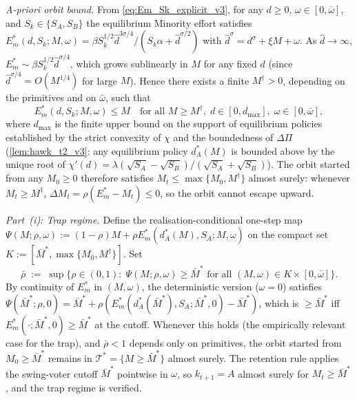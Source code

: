 \documentclass[11pt,twoside]{extarticle}
\begin{document}
\emph{A-priori orbit bound.} From \autoref{eq:Em_Sk_explicit_v3}, for any $d\ge 0$, $\omega\in[0,\bar\omega]$, and $S_k\in\{S_A,S_B\}$ the equilibrium Minority effort satisfies
$E_m^*(d,S_k;M,\omega)=\beta S_k^{1/2}\hat d^{3\sigma/4}/(S_k\alpha+\hat d^{\sigma/2})$
with $\hat d^\sigma=d^\sigma+\xi M+\omega$. As $\hat d\to\infty$, $E_m^*\sim\beta S_k^{1/2}\hat d^{\sigma/4}$, which grows sublinearly in $M$ for any fixed $d$ (since $\hat d^{\sigma/4}=O(M^{1/4})$ for large $M$). Hence there exists a finite $M^\dagger>0$, depending on the primitives and on $\bar\omega$, such that
\begin{equation}\label{eq:orbit_bound_v3}
E_m^*(d,S_k;M,\omega)\le M\quad\text{for all }M\ge M^\dagger,\;d\in[0,d_{\max}],\;\omega\in[0,\bar\omega],
\end{equation}
where $d_{\max}$ is the finite upper bound on the support of equilibrium policies established by the strict convexity of $\chi$ and the boundedness of $\Delta\Pi$ (\autoref{lem:hawk_t2_v3}: any equilibrium policy $d_A^*(M)$ is bounded above by the unique root of $\chi'(d)=\lambda(\sqrt{S_A}-\sqrt{S_B})/(\sqrt{S_A}+\sqrt{S_B})$). The orbit started from any $M_0\ge 0$ therefore satisfies $M_t\le\max\{M_0,M^\dagger\}$ almost surely: whenever $M_t\ge M^\dagger$, $\Delta M_t=\rho(E_m^*-M_t)\le 0$, so the orbit cannot escape upward.

\emph{Part~(i): Trap regime.} Define the realisation-conditional one-step map $\Psi(M;\rho,\omega):=(1-\rho)M+\rho E_m^*(d_A^*(M),S_A;M,\omega)$ on the compact set $K:=[\bar M^*,\max\{M_0,M^\dagger\}]$. Set
\[
\bar\rho\;:=\;\sup\{\rho\in(0,1):\;\Psi(M;\rho,\omega)\ge\bar M^*\text{ for all }(M,\omega)\in K\times[0,\bar\omega]\}.
\]
By continuity of $E_m^*$ in $(M,\omega)$, the deterministic version ($\omega=0$) satisfies $\Psi(\bar M^*;\rho,0)=\bar M^*+\rho(E_m^*(d_A^*(\bar M^*),S_A;\bar M^*,0)-\bar M^*)$, which is $\ge\bar M^*$ iff $E_m^*(\cdot;\bar M^*,0)\ge\bar M^*$ at the cutoff. Whenever this holds (the empirically relevant case for the trap), and $\bar\rho<1$ depends only on primitives, the orbit started from $M_0\ge\bar M^*$ remains in $\mathcal T^*=\{M\ge\bar M^*\}$ almost surely. The retention rule applies the swing-voter cutoff $\bar M^*$ pointwise in $\omega$, so $k_{t+1}=A$ almost surely for $M_t\ge\bar M^*$, and the trap regime is verified.
\end{document}
